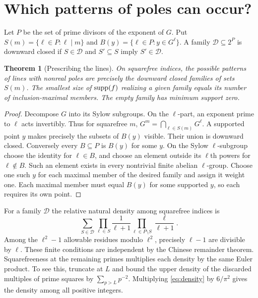\documentclass[11pt,letterpaper]{article}
\newtheorem{theorem}{Theorem}\newtheorem{corollary}[theorem]{Corollary}
\begin{document}
\section{Which patterns of poles can occur?}
Let $P$ be the set of prime divisors of the exponent of $G$. Put $S(m)=\{\ell\in P:\ell\mid m\}$ and
$B(y)=\{\ell\in P:y\in G^\ell\}$. A family $\mathcal D\subseteq 2^P$ is downward closed if $S\in\mathcal D$ and $S'\subseteq S$ imply $S'\in\mathcal D$.

\begin{theorem}[Prescribing the lines]\label{thm:design}
On squarefree indices, the possible patterns of lines with nonreal poles are precisely the downward closed families of sets $S(m)$. The smallest size of $\operatorname{supp}(f)$ realizing a given family equals its number of inclusion-maximal members. The empty family has minimum support zero.
\end{theorem}
\begin{proof}
Decompose $G$ into its Sylow subgroups. On the $\ell$-part, an exponent prime to $\ell$ acts invertibly. Thus for squarefree $m$,
$G^m=\bigcap_{\ell\in S(m)}G^\ell$. A supported point $y$ makes precisely the subsets of $B(y)$ visible. Their union is downward closed. Conversely every $B\subseteq P$ is $B(y)$ for some $y$. On the Sylow $\ell$-subgroup choose the identity for $\ell\in B$, and choose an element outside its $\ell$th powers for $\ell\notin B$. Such an element exists in every nontrivial finite abelian $\ell$-group. Choose one such $y$ for each maximal member of the desired family and assign it weight one. Each maximal member must equal $B(y)$ for some supported $y$, so each requires its own point.
\end{proof}

For a family $\mathcal D$ the relative natural density among squarefree indices is
\begin{equation}
  \sum_{S\in\mathcal D}
     \prod_{\ell\in S}\frac1{\ell+1}
     \prod_{\ell\in P\setminus S}\frac{\ell}{\ell+1}.
  \label{eq:density}
\end{equation}
Among the $\ell^2-1$ allowable residues modulo $\ell^2$, precisely $\ell-1$ are divisible by $\ell$. These finite conditions are independent by the Chinese remainder theorem. Squarefreeness at the remaining primes multiplies each density by the same Euler product. To see this, truncate at $L$ and bound the upper density of the discarded multiples of prime squares by $\sum_{p>L}p^{-2}$. Multiplying \eqref{eq:density} by $6/\pi^2$ gives the density among all positive integers.
\end{document}
